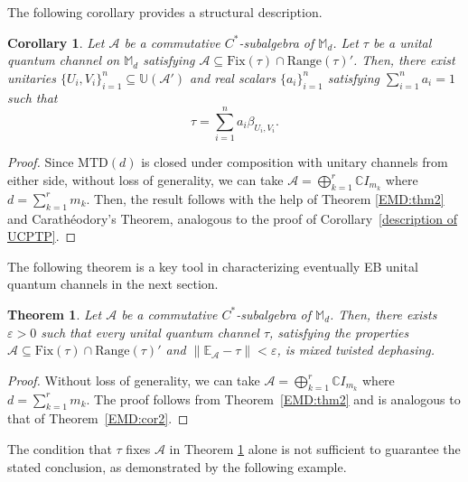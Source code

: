 \documentclass[11pt,reqno]{amsart}
\theoremstyle{definition}
\theoremstyle{plain}
\newtheorem{thm}[defn]{Theorem}
\newtheorem{cor}[defn]{Corollary}
\theoremstyle{remark}
\numberwithin{equation}{section}%
\begin{document}
    		The following corollary provides a structural description.
    		
    		
    		 \begin{cor}
    			Let $\mathcal{A}$ be a commutative $C^*$-subalgebra of $\mathbb{M}_d$. Let $\tau$ be a unital quantum channel on $\mathbb{M}_d$ satisfying $\mathcal{A}\subseteq\text{Fix}(\tau)\cap\text{Range}(\tau)'$. Then, there exist unitaries $\{U_i, V_i\}_{i=1}^n\subseteq\mathbb{U}(\mathcal{A}')$ and real scalars $\{a_i\}_{i=1}^n$ satisfying $\sum_{i=1}^n a_i = 1$ such that 
    			\[
    			\tau =\sum_{i=1}^n a_i \beta_{U_i,V_i}.
    			\]
    		\end{cor}
    		
    		
    		\begin{proof}
    			Since $\mathrm{MTD}(d)$ is closed under composition with unitary channels from either side, without loss of generality, we can take $\mathcal{A} = \bigoplus_{k=1}^r \mathbb{C}I_{m_k}$ where $d = \sum_{k=1}^r m_k$.
                Then, the result follows with the help of Theorem \ref{EMD:thm2} and Carath\'{e}odory's Theorem, analogous to the proof of Corollary~\ref{description of UCPTP}.
    		\end{proof}
    		
    		
    		The following theorem is a key tool in characterizing eventually EB unital quantum channels in the next section.
    		
    		\begin{thm}\label{EMD:cor1}
    			Let $\mathcal{A}$ be a commutative $C^*$-subalgebra of $\mathbb{M}_d$. Then, there exists $\varepsilon>0$ such that every unital quantum channel $\tau$, satisfying the properties $\mathcal{A}\subseteq\text{Fix}(\tau)\cap\text{Range}(\tau)'$ and $\|\mathbb{E}_{\mathcal{A}}-\tau\|<\varepsilon$, is mixed twisted dephasing.
    		\end{thm}
    		
    		\begin{proof}
    			Without loss of generality, we can take $\mathcal{A} = \bigoplus_{k=1}^r \mathbb{C}I_{m_k}$ where $d = \sum_{k=1}^r m_k$. The proof follows from Theorem~\ref{EMD:thm2} and is analogous to that of Theorem~\ref{EMD:cor2}.
    		\end{proof}
    		
    		
    	
    		
 
   The condition that $\tau$ fixes $\mathcal{A}$ in Theorem \ref{EMD:cor1} alone is not sufficient to guarantee the stated conclusion, as demonstrated by the following example. 
  
\end{document}
